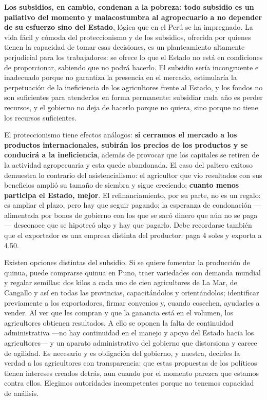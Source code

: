 \documentclass[
  man,
  floatsintext,
  longtable,
  a4paper,
  nolmodern,
  notxfonts,
  notimes,
  12pt,
  colorlinks=true,linkcolor=blue,citecolor=blue,urlcolor=blue]{apa7}
\begin{document}
\textbf{Los subsidios, en cambio, condenan a la pobreza: todo subsidio
es un paliativo del momento y malacostumbra al agropecuario a no
depender de su esfuerzo sino del Estado}, lógica que en el Perú se ha
impregnado. La vida fácil y cómoda del proteccionismo y de los
subsidios, ofrecida por quienes tienen la capacidad de tomar esas
decisiones, es un planteamiento altamente perjudicial para los
trabajadores: se ofrece lo que el Estado no está en condiciones de
proporcionar, sabiendo que no podrá hacerlo. El subsidio sería
incongruente e inadecuado porque no garantiza la presencia en el
mercado, estimularía la perpetuación de la ineficiencia de los
agricultores frente al Estado, y los fondos no son suficientes para
atenderlos en forma permanente: subsidiar cada año es perder recursos, y
el gobierno no deja de hacerlo porque no quiera, sino porque no tiene
los recursos suficientes.

El proteccionismo tiene efectos análogos: \textbf{si cerramos el mercado
a los productos internacionales, subirán los precios de los productos y
se conducirá a la ineficiencia}, además de provocar que los capitales se
retiren de la actividad agropecuaria y esta quede abandonada. El caso
del paltero exitoso demuestra lo contrario del asistencialismo: el
agricultor que vio resultados con sus beneficios amplió su tamaño de
siembra y sigue creciendo; \textbf{cuanto menos participa el Estado,
mejor}. El refinanciamiento, por su parte, no es un regalo: es ampliar
el plazo, pero hay que seguir pagando; la esperanza de condonación
---alimentada por bonos de gobierno con los que se sacó dinero que aún
no se paga--- desconoce que se hipotecó algo y hay que pagarlo. Debe
recordarse también que el exportador es una empresa distinta del
productor: paga 4 soles y exporta a 4.50.

Existen opciones distintas del subsidio. Si se quiere fomentar la
producción de quinua, puede comprarse quinua en Puno, traer variedades
con demanda mundial y regalar semillas: dos kilos a cada uno de cien
agricultores de La Mar, de Cangallo y así en todas las provincias,
capacitándolos y orientándolos; identificar previamente a los
exportadores, firmar convenios y, cuando cosechen, ayudarles a vender.
Al ver que les compran y que la ganancia está en el volumen, los
agricultores obtienen resultados. A ello se oponen la falta de
continuidad administrativa ---no hay continuidad en el manejo y apoyo
del Estado hacia los agricultores--- y un aparato administrativo del
gobierno que distorsiona y carece de agilidad. Es necesario y es
obligación del gobierno, y nuestra, decirles la verdad a los
agricultores con transparencia: que estas propuestas de los políticos
tienen intereses creados detrás, aun cuando por el momento parezca que
estamos contra ellos. Elegimos autoridades incompetentes porque no
tenemos capacidad de análisis.
\end{document}
